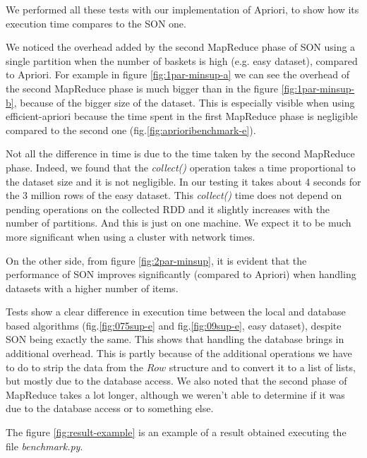 \documentclass[a4paper]{article}
\begin{document}
	We performed all these tests with our implementation of Apriori, to show how its execution time compares to the SON one.
	
	We noticed the overhead added by the second MapReduce phase of SON using a single partition when the number of baskets is high (e.g. easy dataset), compared to Apriori. For example in figure \ref{fig:1par-minsup-a} we can see the overhead of the second MapReduce phase is much bigger than in the figure \ref{fig:1par-minsup-b}, because of the bigger size of the dataset. This is especially visible when using efficient-apriori because the time spent in the first MapReduce phase is negligible compared to the second one (fig.\ref{fig:aprioribenchmark-e}).

	Not all the difference in time is due to the time taken by the second MapReduce phase. Indeed, we found that the \textit{collect()} operation takes a time proportional to the dataset size and it is not
	negligible. In our testing it takes about 4 seconds for the 3 million rows of the easy dataset. This \textit{collect()} time does not depend on pending operations on the collected RDD and it slightly increases with the number of partitions. And this is just on one machine. We expect it to be much
	more significant when using a cluster with network times.

	On the other side, from figure \ref{fig:2par-minsup}, it is evident that the performance of SON improves significantly (compared to Apriori) when handling datasets with a higher number of items. %

	Tests show a clear difference in execution time between the local and database based algorithms (fig.\ref{fig:075sup-e} and fig.\ref{fig:09sup-e}, easy dataset), despite SON being exactly the same. This shows that handling the database brings in additional overhead.
	This is partly because of the additional operations we have to do to strip the data from the $Row$ structure and to convert it to a list of lists, but mostly due to the database access. We also noted that the second phase of MapReduce takes a lot longer, although we weren't able to determine if it was due to the database access or to something else.
	
	The figure \ref{fig:result-example} is an example of a result obtained executing the file \textit{benchmark.py}.
	
\end{document}
